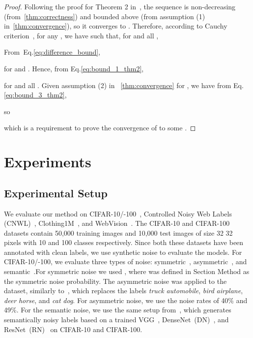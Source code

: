 \documentclass[review]{elsarticle}
\theoremstyle{plain}
\begin{document}
\begin{proof}
Following the proof for Theorem 2 in~\citep{dempster1977maximum}, the sequence  is non-decreasing (from~\autoref{thm:correctness}) and bounded  above (from assumption (1) in~\autoref{thm:convergence}), so it converges to . 
Therefore, according to Cauchy criterion~\citep{nguyen2020tutorial}, for any , we have  such that, for  and all ,

From~Eq.\ref{eq:difference_bound},

for  and . Hence, from Eq.\ref{eq:bound_1_thm2},

for  and all .
Given assumption (2) in ~\autoref{thm:convergence} for , we
 have from Eq.\ref{eq:bound_3_thm2},
 
so

 which is a requirement to prove the convergence of  to some .
\end{proof}


\section{Experiments} 
\label{sec:experiments}






\subsection{Experimental Setup}
\label{sec:experimental_setup}


We evaluate our method on CIFAR-10/-100~\citep{krizhevsky2009learning},  Controlled Noisy Web Labels (CNWL)~\citep{jiang2020beyond}, Clothing1M~\citep{xiao2015learning}, and  WebVision~\citep{li2017webvision}.
The CIFAR-10 and CIFAR-100 datasets contain 50,000 training images and 10,000 test images of size 32  32 pixels with 10 and 100 classes respectively. Since both these datasets have been annotated with clean labels, we use synthetic noise to evaluate the models. 
For CIFAR-10/-100, we evaluate three types of noise: symmetric~\citep{tanaka2018joint,li2019learning}, asymmetric~\citep{tanaka2018joint,li2019learning}, and semantic~\citep{rog}.For symmetric noise we used , where  was defined in Section Method as the symmetric noise probability. 
The asymmetric noise was applied to the dataset, similarly to~\citep{li2020dividemix}, which replaces the labels \emph{truck}  \emph{automobile}, \emph{bird}  \emph{airplane}, \emph{deer}  \emph{horse}, and \emph{cat}  \emph{dog}. For asymmetric noise, we use the noise rates of 40\% and 49\%. For the semantic noise, we use the same setup from~\citep{rog}, which generates semantically noisy labels based on a trained VGG~\citep{vgg}, DenseNet~(DN)~\citep{huang2017densely}, and ResNet~(RN)~\citep{ResNet18} on CIFAR-10 and CIFAR-100.
\end{document}
